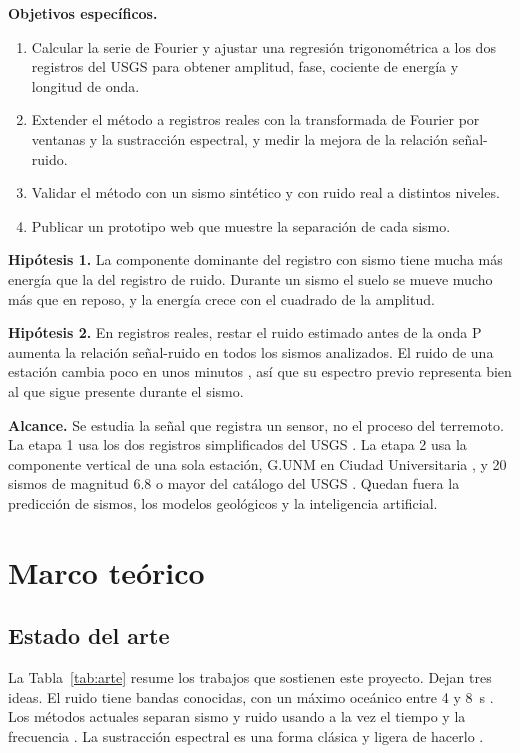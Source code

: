 \documentclass[11pt,letterpaper]{article}
\begin{document}
\textbf{Objetivos específicos.}
\begin{enumerate}
\item Calcular la serie de Fourier y ajustar una regresión trigonométrica a los dos registros del USGS para obtener amplitud, fase, cociente de energía y longitud de onda.
\item Extender el método a registros reales con la transformada de Fourier por ventanas y la sustracción espectral, y medir la mejora de la relación señal-ruido.
\item Validar el método con un sismo sintético y con ruido real a distintos niveles.
\item Publicar un prototipo web que muestre la separación de cada sismo.
\end{enumerate}

\textbf{Hipótesis 1.} La componente dominante del registro con sismo tiene mucha más energía que la del registro de ruido. Durante un sismo el suelo se mueve mucho más que en reposo, y la energía crece con el cuadrado de la amplitud.

\textbf{Hipótesis 2.} En registros reales, restar el ruido estimado antes de la onda P aumenta la relación señal-ruido en todos los sismos analizados. El ruido de una estación cambia poco en unos minutos \parencite{mcnamara2004}, así que su espectro previo representa bien al que sigue presente durante el sismo.

\textbf{Alcance.} Se estudia la señal que registra un sensor, no el proceso del terremoto. La etapa 1 usa los dos registros simplificados del USGS \parencite{expediente}. La etapa 2 usa la componente vertical de una sola estación, G.UNM en Ciudad Universitaria \parencite{geoscope}, y 20 sismos de magnitud 6.8 o mayor del catálogo del USGS \parencite{comcat}. Quedan fuera la predicción de sismos, los modelos geológicos y la inteligencia artificial.

\section{Marco teórico}

\subsection{Estado del arte}
La Tabla~\ref{tab:arte} resume los trabajos que sostienen este proyecto. Dejan tres ideas. El ruido tiene bandas conocidas, con un máximo oceánico entre 4 y \SI{8}{s} \parencite{peterson1993,longuet1950}. Los métodos actuales separan sismo y ruido usando a la vez el tiempo y la frecuencia \parencite{zhu2019,mousavi2016}. La sustracción espectral es una forma clásica y ligera de hacerlo \parencite{boll1979}.
\end{document}
